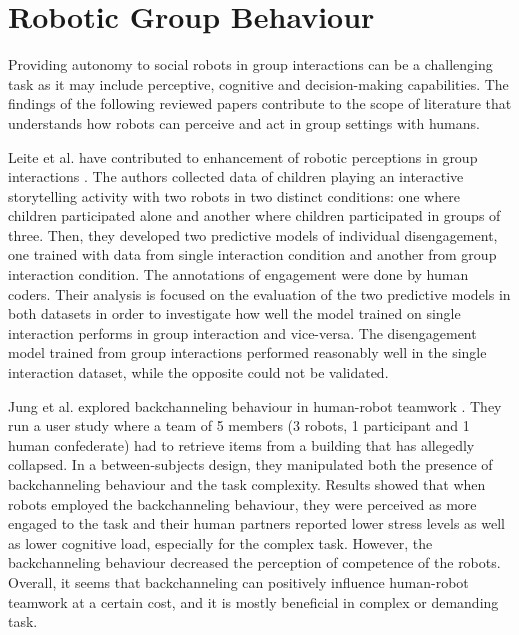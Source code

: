 \section{Robotic Group Behaviour}
\label{sec:behaviour}
Providing autonomy to social robots in group interactions can be a challenging task as it may include perceptive, cognitive and decision-making capabilities. The findings of the following reviewed papers contribute to the scope of literature that understands how robots can perceive and act in group settings with humans.

Leite et al. have contributed to enhancement of robotic perceptions in group interactions \cite{leite2015comparing}. The authors collected data of children playing an interactive storytelling activity with two robots in two distinct conditions: one where children participated alone and another where children participated in groups of three. Then, they developed two predictive models of individual disengagement, one trained with data from single interaction condition and another from group interaction condition. The annotations of engagement were done by human coders. Their analysis is focused on the evaluation of the two predictive models in both datasets in order to investigate how well the model trained on single interaction performs in group interaction and vice-versa. The disengagement model trained from group interactions performed reasonably well in the single interaction dataset, while the opposite could not be validated.

Jung et al. explored backchanneling behaviour in human-robot teamwork \cite{jung2013engaging}. They run a user study where a team of 5 members (3 robots, 1 participant and 1 human confederate) had to retrieve items from a building that has allegedly collapsed. In a between-subjects design, they manipulated both the presence of backchanneling behaviour and the task complexity. Results showed that when robots employed the backchanneling behaviour, they were perceived as more engaged to the task and their human partners reported lower stress levels as well as lower cognitive load, especially for the complex task. However, the backchanneling behaviour decreased the perception of competence of the robots. Overall, it seems that backchanneling can positively influence human-robot teamwork at a certain cost, and it is mostly beneficial in complex or demanding task.

